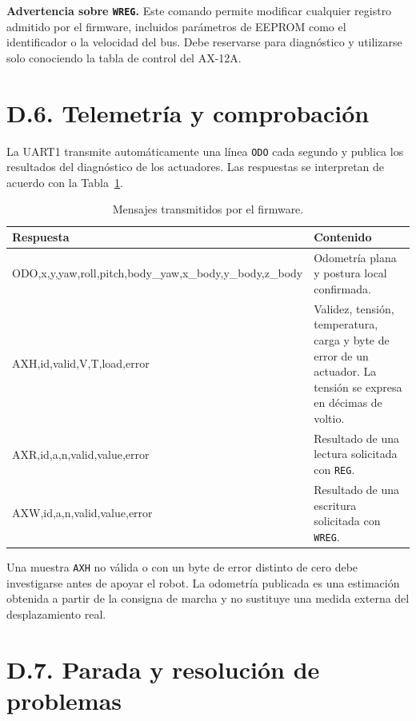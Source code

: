 \noindent\textbf{Advertencia sobre \texttt{WREG}.} Este comando permite
modificar cualquier registro admitido por el firmware, incluidos parámetros de
EEPROM como el identificador o la velocidad del bus. Debe reservarse para
diagnóstico y utilizarse solo conociendo la tabla de control del AX-12A.

\section*{D.6. Telemetría y comprobación}

La UART1 transmite automáticamente una línea \texttt{ODO} cada segundo y
publica los resultados del diagnóstico de los actuadores. Las respuestas se
interpretan de acuerdo con la Tabla~\ref{tab:manual_respuestas_uart}.

\begin{table}[H]
    \centering
    \footnotesize
    \begin{tabularx}{\textwidth}{@{}>{\ttfamily}lX@{}}
        \toprule
        \normalfont\textbf{Respuesta} & \textbf{Contenido} \\
        \midrule
        ODO,x,y,yaw,roll,pitch,body\_yaw,x\_body,y\_body,z\_body & Odometría plana y postura local confirmada. \\
        AXH,id,valid,V,T,load,error & Validez, tensión, temperatura, carga y byte de error de un actuador. La tensión se expresa en décimas de voltio. \\
        AXR,id,a,n,valid,value,error & Resultado de una lectura solicitada con \texttt{REG}. \\
        AXW,id,a,n,valid,value,error & Resultado de una escritura solicitada con \texttt{WREG}. \\
        \bottomrule
    \end{tabularx}
    \caption{Mensajes transmitidos por el firmware.}
    \label{tab:manual_respuestas_uart}
\end{table}

Una muestra \texttt{AXH} no válida o con un byte de error distinto de cero
debe investigarse antes de apoyar el robot. La odometría publicada es una
estimación obtenida a partir de la consigna de marcha y no sustituye una medida
externa del desplazamiento real.

\section*{D.7. Parada y resolución de problemas}

